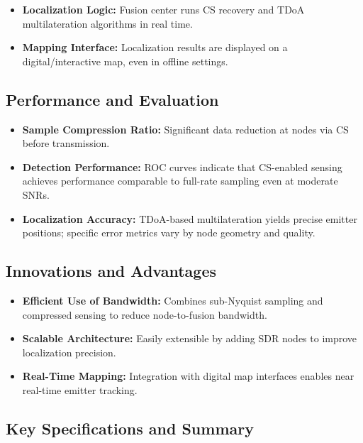 \documentclass[14pt]{book}
\begin{document}
\begin{itemize}
	\item \textbf{Localization Logic:} Fusion center runs CS recovery and TDoA multilateration algorithms in real time.
	
	\item \textbf{Mapping Interface:} Localization results are displayed on a digital/interactive map, even in offline settings.
\end{itemize}

\subsection{Performance and Evaluation}

\begin{itemize}
	\item \textbf{Sample Compression Ratio:} Significant data reduction at nodes via CS before transmission.
	
	\item \textbf{Detection Performance:} ROC curves indicate that CS-enabled sensing achieves performance comparable to full-rate sampling even at moderate SNRs.
	
	\item \textbf{Localization Accuracy:} TDoA-based multilateration yields precise emitter positions; specific error metrics vary by node geometry and quality.
\end{itemize}

\subsection{Innovations and Advantages}

\begin{itemize}
	\item \textbf{Efficient Use of Bandwidth:} Combines sub-Nyquist sampling and compressed sensing to reduce node-to-fusion bandwidth.
	
	\item \textbf{Scalable Architecture:} Easily extensible by adding SDR nodes to improve localization precision.
	
	\item \textbf{Real-Time Mapping:} Integration with digital map interfaces enables near real-time emitter tracking.
\end{itemize}

\subsection{Key Specifications and Summary}
\end{document}
